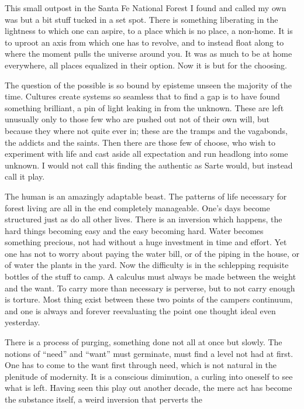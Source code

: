 \documentclass[ebook, 10pt, openright, onecolumn]{memoir}
\newcommand*\td[1]{
  \todo[inline]{
     #1 
  }
}
\newcommand*\finish{\td{ ----- Finish this section -----}}
\begin{document}
This small outpost in the Santa Fe National Forest I found and called my own was
but a bit stuff tucked in a set spot.  There is something liberating in the
lightness to which one can aspire, to a place which is no place, a non-home.  It
is to uproot an axis from which one has to revolve, and to instead float along
to where the moment pulls the universe around you.  It was as much to be at home
everywhere, all places equalized in their option. Now it is but for the
choosing.  

\finish

The question of the possible is so bound by episteme unseen the majority of the
time.  Cultures create systems so seamless that to find a gap is to have found
something brilliant, a pin of light leaking in from the unknown.  These are left
unusually only to those few who are pushed out not of their own will, but
because they where not quite ever in; these are the tramps and the vagabonds,
the addicts and the saints.  Then there are those few of choose, who wish to
experiment with life and cast aside all expectation and run headlong into some
unknown.  I would not call this finding the authentic as Sarte would, but
instead call it play.

The human is an amazingly adaptable beast.  The patterns of life necessary for
forest living are all in the end completely manageable.  One's days become
structured just as do all other lives.  There is an inversion which happens, the
hard things becoming easy and the easy becoming hard.  Water becomes something
precious, not had without a huge investment in time and effort.  Yet one has not
to worry about paying the water bill, or of the piping in the house, or of water
the plants in the yard.  Now the difficulty is in the schlepping requisite
bottles of the stuff to camp.  A calculus must always be made between the weight
and the want.  To carry more than necessary is perverse, but to not carry enough
is torture.  Most thing exist between these two points of the campers continuum,
and one is always and forever reevaluating the point one thought ideal even
yesterday.

There is a process of purging, something done not all at once but slowly.  The
notions of ``need'' and ``want'' must germinate, must find a level not had at
first.  One has to come to the want first through need, which is not natural in
the plenitude of modernity.  It is a conscious diminution, a curling into
oneself to see what is left.  Having seen this play out another decade, the mere
act has become the substance itself, a weird inversion that perverts the
\end{document}
